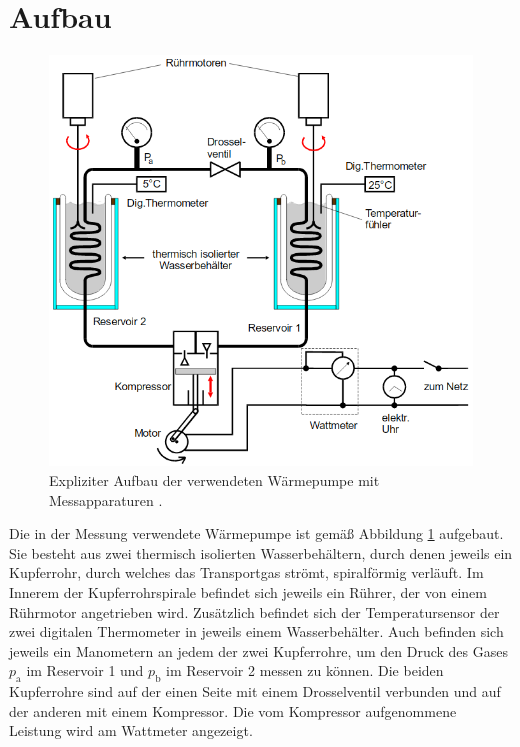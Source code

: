 \section{Aufbau}
\label{sec:Aufbau}
\begin{figure}
	\centering
	\includegraphics[width=\linewidth-100pt,height=\textheight-100pt,keepaspectratio]{content/Bilder/Aufbau2.png}
	\caption{Expliziter Aufbau der verwendeten Wärmepumpe mit Messapparaturen \cite{V206}.}
	\label{fig:Aufbau2}
\end{figure}
Die in der Messung verwendete Wärmepumpe ist gemäß Abbildung \ref{fig:Aufbau2} aufgebaut. Sie besteht aus zwei thermisch isolierten Wasserbehältern, durch denen jeweils ein Kupferrohr, durch welches das Transportgas strömt, spiralförmig verläuft. Im Innerem der Kupferrohrspirale befindet sich jeweils ein Rührer, der von einem Rührmotor angetrieben wird. Zusätzlich befindet sich der Temperatursensor der zwei digitalen Thermometer in jeweils einem Wasserbehälter. Auch befinden sich jeweils ein Manometern an jedem der zwei Kupferrohre, um den Druck des Gases $p_\text{a}$ im Reservoir 1 und $p_\text{b}$ im Reservoir 2 messen zu können. Die beiden Kupferrohre sind auf der einen Seite mit einem Drosselventil verbunden und auf der anderen mit einem Kompressor. Die vom Kompressor aufgenommene Leistung wird am Wattmeter angezeigt.